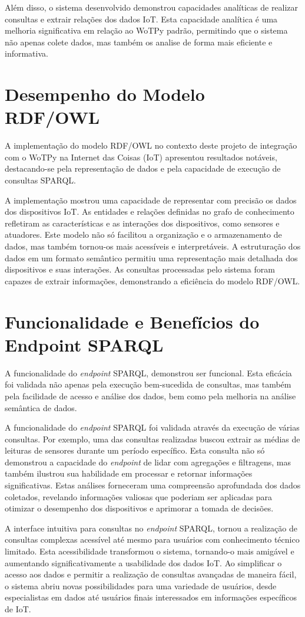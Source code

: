 Além disso, o sistema desenvolvido demonstrou capacidades analíticas de realizar consultas e extrair relações dos dados IoT. Esta capacidade analítica é uma melhoria significativa em relação ao WoTPy padrão, permitindo que o sistema não apenas colete dados, mas também os analise de forma mais eficiente e informativa.

\section{Desempenho do Modelo RDF/OWL}

A implementação do modelo RDF/OWL no contexto deste projeto de integração com o WoTPy na Internet das Coisas (IoT) apresentou resultados notáveis, destacando-se pela representação de dados e pela capacidade de execução de consultas SPARQL.

A implementação mostrou uma capacidade de representar com precisão os dados dos dispositivos IoT. As entidades e relações definidas no grafo de conhecimento refletiram as características e as interações dos dispositivos, como sensores e atuadores. Este modelo não só facilitou a organização e o armazenamento de dados, mas também tornou-os mais acessíveis e interpretáveis. A estruturação dos dados em um formato semântico permitiu uma representação mais detalhada dos dispositivos e suas interações. As consultas processadas pelo sistema foram capazes de extrair informações, demonstrando a eficiência do modelo RDF/OWL. 

\section{Funcionalidade e Benefícios do Endpoint SPARQL}

A funcionalidade do \textit{endpoint} SPARQL, demonstrou ser funcional. Esta eficácia foi validada não apenas pela execução bem-sucedida de consultas, mas também pela facilidade de acesso e análise dos dados, bem como pela melhoria na análise semântica de dados.

A funcionalidade do \textit{endpoint} SPARQL foi validada através da execução de várias consultas. Por exemplo, uma das consultas realizadas buscou extrair as médias de leituras de sensores durante um período específico. Esta consulta não só demonstrou a capacidade do \textit{endpoint} de lidar com agregações e filtragens, mas também ilustrou sua habilidade em processar e retornar informações significativas. Estas análises forneceram uma compreensão aprofundada dos dados coletados, revelando informações valiosas que poderiam ser aplicadas para otimizar o desempenho dos dispositivos e aprimorar a tomada de decisões.

A interface intuitiva para consultas no \textit{endpoint} SPARQL, tornou a realização de consultas complexas acessível até mesmo para usuários com conhecimento técnico limitado. Esta acessibilidade transformou o sistema, tornando-o mais amigável e aumentando significativamente a usabilidade dos dados IoT. Ao simplificar o acesso aos dados e permitir a realização de consultas avançadas de maneira fácil, o sistema abriu novas possibilidades para uma variedade de usuários, desde especialistas em dados até usuários finais interessados em informações específicos de IoT.
